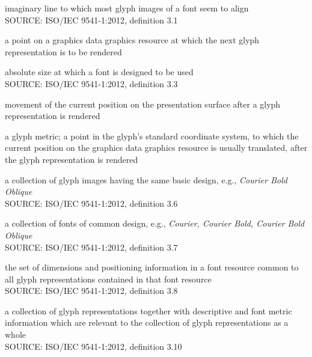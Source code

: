 
imaginary line to which most glyph images of a font seem to align \\
\lbrack SOURCE: ISO/IEC 9541-1:2012, definition 3.1 \rbrack

a point on a graphics data graphics resource at which the next glyph representation is to be rendered

absolute size at which a font is designed to be used \\
\lbrack SOURCE: ISO/IEC 9541-1:2012, definition 3.3 \rbrack

movement of the current position on the presentation surface after a glyph representation is rendered

a glyph metric; a point in the glyph's standard coordinate system, to which the current position on the graphics data graphics resource is usually translated, after the glyph representation is rendered

a collection of glyph images having the same basic design, e.g., \textit{Courier Bold Oblique} \\
\lbrack SOURCE: ISO/IEC 9541-1:2012, definition 3.6 \rbrack

a collection of fonts of common design, e.g., \textit{Courier, Courier Bold, Courier Bold Oblique} \\
\lbrack SOURCE: ISO/IEC 9541-1:2012, definition 3.7 \rbrack

the set of dimensions and positioning information in a font resource common to all glyph representations contained in that font resource \\
\lbrack SOURCE: ISO/IEC 9541-1:2012, definition 3.8 \rbrack

%
a collection of glyph representations together with descriptive and font metric information which are relevant to the collection of glyph representations as a whole \\
\lbrack SOURCE: ISO/IEC 9541-1:2012, definition 3.10 \rbrack

